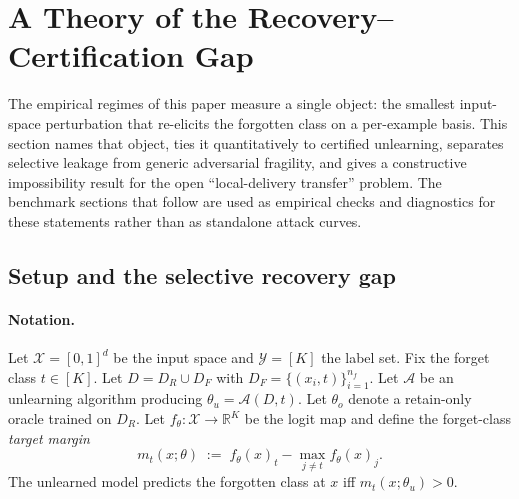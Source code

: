 %
%     

\section{A Theory of the Recovery--Certification Gap}
\label{sec:theory}

The empirical regimes of this paper measure a single object: the smallest
input-space perturbation that re-elicits the forgotten class on a per-example
basis. This section names that object, ties it quantitatively to certified
unlearning, separates selective leakage from generic adversarial fragility,
and gives a constructive impossibility result for the open
``local-delivery transfer'' problem. The benchmark sections that follow are
used as empirical checks and diagnostics for these statements rather than as
standalone attack curves.

\subsection{Setup and the selective recovery gap}

\paragraph{Notation.} Let $\mathcal{X} = [0,1]^d$ be the input space and
$\mathcal{Y} = [K]$ the label set. Fix the forget class $t \in [K]$. Let
$D = D_R \cup D_F$ with $D_F = \{(x_i, t)\}_{i=1}^{n_f}$. Let $\mathcal{A}$ be
an unlearning algorithm producing $\theta_u = \mathcal{A}(D, t)$. Let
$\theta_o$ denote a retain-only oracle trained on $D_R$. Let
$f_\theta : \mathcal{X} \to \mathbb{R}^K$ be the logit map and define the
forget-class \emph{target margin}
\begin{equation}
  m_t(x;\theta) \;:=\; f_\theta(x)_t - \max_{j \neq t} f_\theta(x)_j.
\end{equation}
The unlearned model predicts the forgotten class at $x$ iff
$m_t(x;\theta_u) > 0$.


